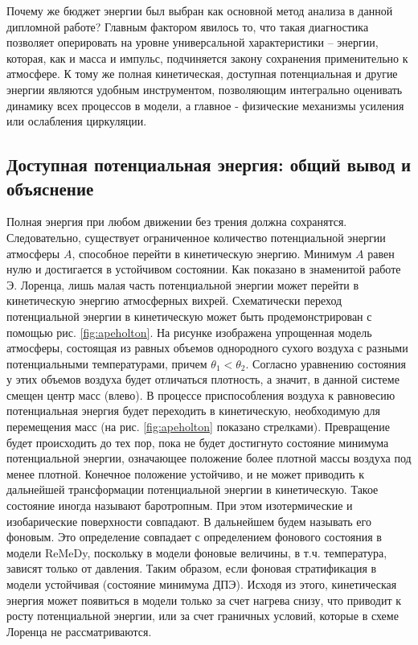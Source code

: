 \documentclass[12pt,a4paper]{report}
\begin{document}
Почему же бюджет энергии был выбран как основной метод анализа в данной дипломной работе? Главным фактором явилось то, что такая диагностика позволяет оперировать на уровне универсальной характеристики -- энергии, которая, как и масса и импульс, подчиняется закону сохранения применительно к атмосфере. К тому же полная кинетическая, доступная потенциальная и другие энергии являются удобным инструментом, позволяющим интегрально оценивать динамику всех процессов в модели, а главное - физические механизмы усиления или ослабления циркуляции.

\subsection{Доступная потенциальная энергия: общий вывод и объяснение}
\label{sec:APEtheory}
Полная энергия при любом движении без трения должна сохранятся. Следовательно, существует ограниченное количество потенциальной энергии атмосферы $A$, способное перейти в кинетическую энергию. Минимум $A$ равен нулю и достигается в устойчивом состоянии. Как показано в знаменитой работе Э. Лоренца, лишь малая часть потенциальной энергии может перейти в кинетическую энергию атмосферных вихрей. Схематически переход потенциальной энергии в кинетическую может быть продемонстрирован с помощью рис. \ref{fig:apeholton}. На рисунке изображена упрощенная модель атмосферы, состоящая из равных объемов однородного сухого воздуха с разными потенциальными температурами, причем $\theta_1 < \theta_2$. Согласно уравнению состояния у этих объемов воздуха будет отличаться плотность, а значит, в данной системе смещен центр масс (влево). В процессе приспособления воздуха к равновесию потенциальная энергия будет переходить в кинетическую, необходимую для перемещения масс (на рис.  \ref{fig:apeholton} показано стрелками). Превращение будет происходить до тех пор, пока не будет достигнуто состояние минимума потенциальной энергии, означающее положение более плотной массы воздуха под менее плотной. Конечное положение устойчиво, и не может приводить к дальнейшей трансформации потенциальной энергии в кинетическую. Такое состояние иногда называют баротропным. При этом изотермические и изобарические поверхности совпадают. В дальнейшем будем называть его фоновым. Это определение совпадает с определением фонового состояния в модели ReMeDy, поскольку в модели фоновые величины, в т.ч. температура, зависят только от давления. Таким образом, если фоновая стратификация в модели устойчивая (состояние минимума ДПЭ). Исходя из этого, кинетическая энергия может появиться в модели только за счет нагрева снизу, что приводит к росту потенциальной энергии, или за счет граничных условий, которые в схеме Лоренца не рассматриваются. 
\end{document}
